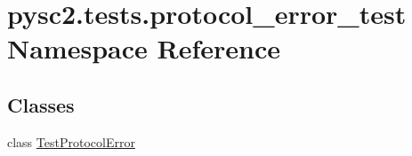 \hypertarget{namespacepysc2_1_1tests_1_1protocol__error__test}{}\section{pysc2.\+tests.\+protocol\+\_\+error\+\_\+test Namespace Reference}
\label{namespacepysc2_1_1tests_1_1protocol__error__test}
\subsection*{Classes}
\begin{DoxyCompactItemize}
\item 
class \mbox{\hyperlink{classpysc2_1_1tests_1_1protocol__error__test_1_1_test_protocol_error}{Test\+Protocol\+Error}}
\end{DoxyCompactItemize}
